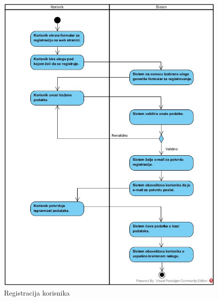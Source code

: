 \documentclass{article}
\begin{document}
\begin{figure}[htbp!]
\centering
\includegraphics[scale=0.6]{Registracija_korisnika.jpg}
\caption{Registracija korisnika}
\label{slk:dtp}
\end{figure}

\newpage
\end{document}
